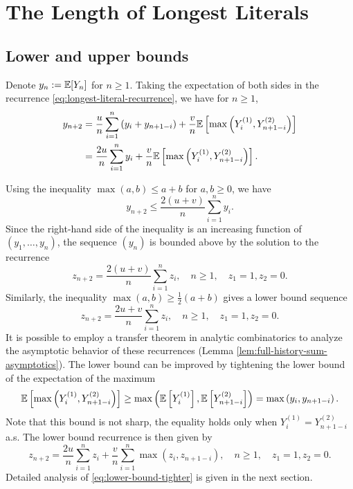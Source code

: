 \chapter{The Length of Longest Literals}
\section{Lower and upper bounds}

Denote $y_n := \mathbb{E}[Y_n]$ for $n \ge 1$. Taking the expectation of both sides in the recurrence \eqref{eq:longest-literal-recurrence}, we have for $n \ge 1$,
\begin{align*}
  y_{n+2}
   & = \dfrac{u}{n}\sum\limits_{i=1}^n\left(y_{i} + y_{n+1-i}\right) + \dfrac{v}{n}\mathbb{E}\left[\max\left(Y_{i}^{(1)}, Y_{n+1-i}^{(2)}\right)\right] \\
   & = \dfrac{2u}{n}\sum\limits_{i=1}^n y_{i} + \dfrac{v}{n}\mathbb{E}\left[\max\left(Y_{i}^{(1)}, Y_{n+1-i}^{(2)}\right)\right].
\end{align*}

Using the inequality $\max(a,b) \le a + b$ for $a,b \ge 0$, we have
$$y_{n+2} \le \dfrac{2(u+v)}{n}\sum\limits_{i=1}^n y_{i}.$$
Since the right-hand side of the inequality is an increasing function of $(y_1, \ldots, y_n)$, the sequence $(y_n)$ is bounded above by the solution to the recurrence
\begin{equation}
  \label{eq:upper-bound}
  z_{n+2} = \dfrac{2(u+v)}{n}\sum\limits_{i=1}^n z_{i}, \quad n \ge 1, \quad z_1 = 1, z_2 = 0.
\end{equation}
Similarly, the inequality $\max(a,b) \ge \frac{1}{2}(a+b)$ gives a lower bound sequence
\begin{equation}
  \label{eq:lower-bound}
  z_{n+2} = \dfrac{2u+v}{n}\sum\limits_{i=1}^n z_{i}, \quad n \ge 1, \quad z_1 = 1, z_2 = 0.
\end{equation}
It is possible to employ a transfer theorem in analytic combinatorics to analyze the asymptotic behavior of these recurrences (Lemma \ref{lem:full-history-sum-asymptotics}). The lower bound can be improved by tightening the lower bound of the expectation of the maximum
$$\mathbb{E}\left[\max\left(Y_{i}^{(1)}, Y_{n+1-i}^{(2)}\right)\right] \ge \max\left(\mathbb{E}\left[Y_{i}^{(1)}\right], \mathbb{E}\left[Y_{n+1-i}^{(2)}\right]\right) = \max\left(y_i, y_{n+1-i}\right).$$
Note that this bound is not sharp, the equality holds only when $Y_{i}^{(1)} = Y_{n+1-i}^{(2)}$ a.s. The lower bound recurrence is then given by
\begin{equation}
  \label{eq:lower-bound-tighter}
  z_{n+2} = \dfrac{2u}{n}\sum\limits_{i=1}^n z_{i} + \dfrac{v}{n}\sum\limits_{i=1}^n \max\left(z_i, z_{n+1-i}\right), \quad n \ge 1, \quad z_1 = 1, z_2 = 0.
\end{equation}
Detailed analysis of \eqref{eq:lower-bound-tighter} is given in the next section.

